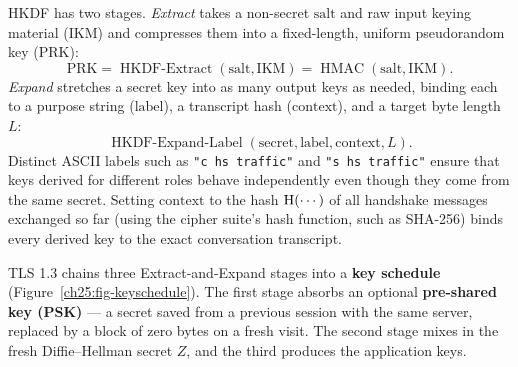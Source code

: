 HKDF has two stages. \emph{Extract} takes a non-secret $\text{salt}$ and raw input
keying material ($\mathrm{IKM}$) and compresses them into a fixed-length, uniform
pseudorandom key ($\mathrm{PRK}$):
\[
\mathrm{PRK} = \operatorname{HKDF\text{-}Extract}(\text{salt}, \mathrm{IKM})
= \operatorname{HMAC}(\text{salt}, \mathrm{IKM}).
\]
\emph{Expand} stretches a secret key into as many output keys as needed, binding
each to a purpose string ($\text{label}$), a transcript hash ($\text{context}$),
and a target byte length $L$:
\[
\operatorname{HKDF\text{-}Expand\text{-}Label}(\text{secret}, \text{label}, \text{context}, L).
\]
Distinct ASCII labels such as \texttt{"c hs traffic"} and \texttt{"s hs traffic"}
ensure that keys derived for different roles behave independently even though they
come from the same secret. Setting $\text{context}$ to the hash $\operatorname{H}(\cdots)$ of
all handshake messages exchanged so far (using the cipher suite's hash function,
such as SHA-256) binds every derived key to the exact conversation transcript.

TLS 1.3 chains three Extract-and-Expand stages into a \textbf{key schedule}
(Figure~\ref{ch25:fig-keyschedule}). The first stage absorbs an optional
\textbf{pre-shared key (PSK)} --- a secret saved from a previous session with the
same server, replaced by a block of zero bytes on a fresh visit. The second stage
mixes in the fresh Diffie--Hellman secret $Z$, and the third produces the
application keys.

